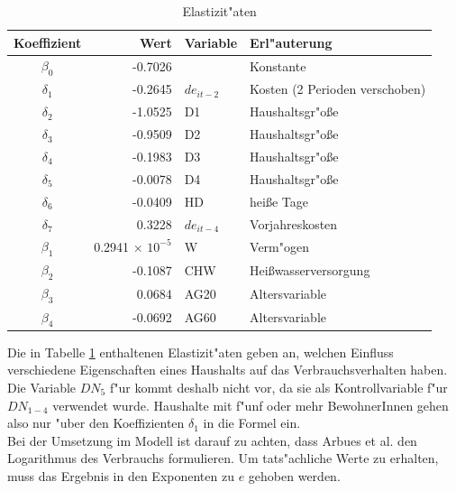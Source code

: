 \documentclass[11pt,a4paper]{article}
\begin{document}
\begin{table}[h]
\begin{tabular}{|c|r|l|l|}
\hline \textbf{Koeffizient} & \textbf{Wert} & \textbf{Variable} & \textbf{Erl"auterung}\\
\hline $\beta_0$ & -0.7026 &  & Konstante \\
\hline $\delta_1$ & -0.2645 & $de_{it-2}$ & Kosten (2 Perioden verschoben)\\
\hline $\delta_2$ & -1.0525 & D1 & Haushaltsgr"oße\\
\hline $\delta_3$ & -0.9509 & D2 & Haushaltsgr"oße\\
\hline $\delta_4$ & -0.1983 & D3 & Haushaltsgr"oße\\
\hline $\delta_5$ & -0.0078 & D4 & Haushaltsgr"oße\\
\hline $\delta_6$ & -0.0409 & HD & heiße Tage \\
\hline $\delta_7$ & 0.3228 & $de_{it-4}$ & Vorjahreskosten\\
\hline $\beta_1$ & 0.2941 $\times$ $10^{-5}$ & W & Verm"ogen\\
\hline $\beta_2$ & -0.1087 & CHW & Heißwasserversorgung\\
\hline $\beta_3$ & 0.0684 & AG20 & Altersvariable\\
\hline $\beta_4$ & -0.0692 & AG60 & Altersvariable\\
\hline
\end{tabular}
\caption{Elastizit"aten}
\label{tab:elasticities}
\end{table}


Die in Tabelle \ref{tab:elasticities} enthaltenen Elastizit"aten geben an, welchen Einfluss verschiedene Eigenschaften eines Haushalts auf das Verbrauchsverhalten haben. Die Variable $DN_{5}$ f"ur kommt deshalb nicht vor, da sie als Kontrollvariable f"ur $DN_{1-4}$ verwendet wurde. Haushalte mit f"unf oder mehr BewohnerInnen gehen also nur "uber den Koeffizienten  $\delta_1$ in die Formel ein. \\
Bei der Umsetzung im Modell ist darauf zu achten, dass Arbues et al. den Logarithmus des Verbrauchs formulieren. Um tats"achliche Werte zu erhalten, muss das Ergebnis in den Exponenten zu $e$ gehoben werden.\\
\end{document}
